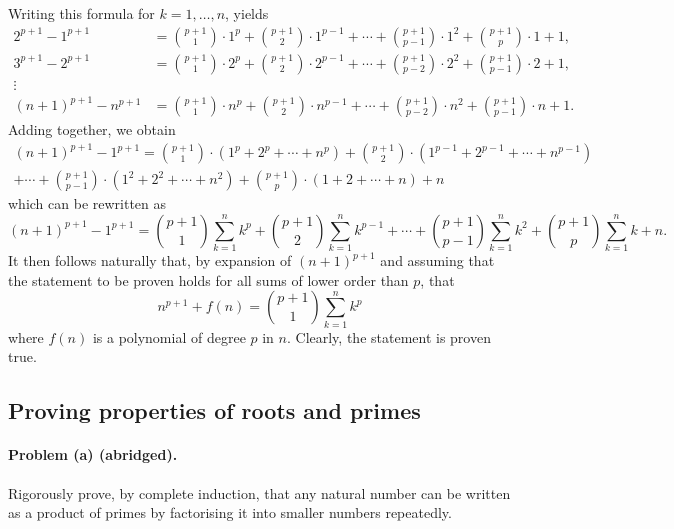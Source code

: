 \documentclass{article}
\begin{document}
Writing this formula for $k = 1, \ldots, n$, yields \begin{align*}
  2^{p+1} - 1^{p+1} &= \binom{p+1}{1} \cdot 1^p + \binom{p+1}{2} \cdot 1^{p-1}
  + \cdots + \binom{p+1}{p-1} \cdot 1^2 + \binom{p+1}{p} \cdot 1 + 1, \\
  3^{p+1} - 2^{p+1} &= \binom{p+1}{1} \cdot 2^p + \binom{p+1}{2} \cdot 2^{p-1}
  + \cdots + \binom{p+1}{p-2} \cdot 2^2 + \binom{p+1}{p-1} \cdot 2 + 1, \\
  \vdots & \\
  (n + 1)^{p+1} - n^{p+1} &= \binom{p+1}{1} \cdot n^p + \binom{p+1}{2} \cdot
  n^{p-1} + \cdots + \binom{p+1}{p-2} \cdot n^2 + \binom{p+1}{p-1} \cdot n + 1.
\end{align*}
Adding together, we obtain \begin{multline*}
  (n + 1)^{p+1} - 1^{p+1} = \binom{p+1}{1} \cdot (1^p + 2^p + \cdots + n^p) +
  \binom{p+1}{2} \cdot (1^{p-1} + 2^{p-1} + \cdots + n^{p-1}) \\ + \cdots +
  \binom{p+1}{p-1} \cdot (1^2 + 2^2 + \cdots + n^2) + \binom{p+1}{p} \cdot (1 +
  2 + \cdots + n) + n
\end{multline*} which can be rewritten as \begin{equation*}
  (n + 1)^{p+1} - 1^{p+1} = \binom{p+1}{1} \sum^n_{k=1} k^p + \binom{p+1}{2}
  \sum^n_{k=1} k^{p-1} + \cdots + \binom{p+1}{p-1} \sum^n_{k=1} k^2 +
  \binom{p+1}{p} \sum^n_{k=1} k + n.
\end{equation*}
It then follows naturally that, by expansion of $(n + 1)^{p+1}$ and assuming
that the statement to be proven holds for all sums of lower order than $p$,
that \begin{equation*}
  n^{p+1} + f(n) = \binom{p+1}{1} \sum^n_{k=1} k^p
\end{equation*} where $f(n)$ is a polynomial of degree $p$ in $n$. Clearly, the
statement is proven true.

\setcounter{subsection}{16}
\subsection{Proving properties of roots and primes}

\paragraph{Problem (a) (abridged).} Rigorously prove, by complete induction,
that any natural number can be written as a product of primes by factorising it
into smaller numbers repeatedly.
\end{document}
